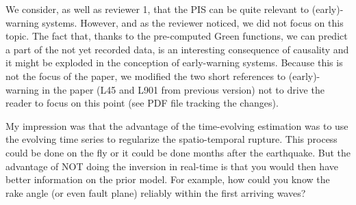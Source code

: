 \documentclass[10pt]{extarticle}
\begin{document}
\begin{Answer}
We consider, as well as reviewer 1, that the PIS can be quite relevant to (early)- 
warning systems. However, and as the reviewer noticed, we did not focus on this 
topic. The fact that, thanks to the pre-computed Green functions, we can predict 
a part of the not yet recorded data, is an interesting consequence of causality 
and it might be exploded in the conception of early-warning systems. Because this
is not the focus of the paper, we modified the two short references to (early)-warning 
in the paper (L45 and L901 from previous version) not to drive the reader to focus 
on this point (see PDF file tracking the changes).\\
 \WorkInProgressRevTask
\end{Answer}
%
%
\begin{ReviewerComment}{1}
\noindent 
 My impression was that the advantage of the time-evolving estimation was to use the
 evolving time series to regularize the spatio-temporal rupture. This process could be done
 on the fly or it could be done months after the earthquake. But the advantage of NOT
 doing the inversion in real-time is that you would then have better information on the prior
 model. For example, how could you know the rake angle (or even fault plane) reliably
 within the first arriving waves?
\end{ReviewerComment}
%
\end{document}
